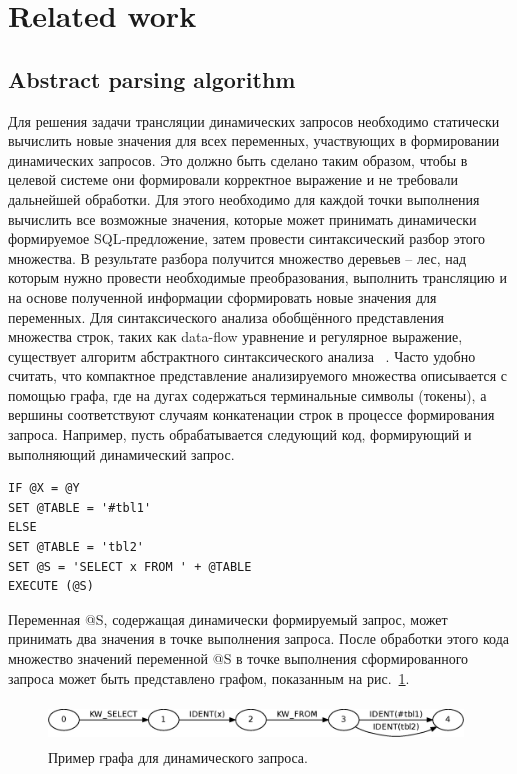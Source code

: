 \documentclass{llncs}
\begin{document}
\section{Related work}

\subsection{Abstract parsing algorithm}

Для решения задачи трансляции динамических запросов необходимо статически вычислить новые значения для всех переменных, участвующих в формировании динамических запросов. Это должно быть сделано  таким образом, чтобы в целевой системе они формировали корректное выражение и не требовали дальнейшей обработки. Для этого необходимо для каждой точки выполнения вычислить все возможные значения, которые может принимать динамически формируемое SQL-предложение, затем провести синтаксический разбор этого множества. В результате разбора получится множество деревьев -- лес, над которым нужно провести необходимые преобразования, выполнить трансляцию и на основе полученной информации сформировать новые значения для переменных.
	Для синтаксического анализа обобщённого представления множества строк, таких как data-flow уравнение и регулярное выражение, существует алгоритм абстрактного синтаксического анализа ~\cite{AbstrParsing}. Часто удобно считать, что компактное представление анализируемого множества описывается с помощью графа, где на дугах содержаться терминальные символы (токены), а вершины соответствуют случаям конкатенации строк в процессе формирования запроса. Например, пусть обрабатывается следующий код, формирующий и выполняющий динамический запрос.
\begin{verbatim}
IF @X = @Y
SET @TABLE = '#tbl1'
ELSE
SET @TABLE = 'tbl2'
SET @S = 'SELECT x FROM ' + @TABLE
EXECUTE (@S)
\end{verbatim}
Переменная @S, содержащая динамически формируемый запрос, может принимать два значения в точке выполнения запроса. После обработки этого кода  множество значений переменной @S в точке выполнения сформированного запроса может быть представлено графом, показанным на рис.~\ref{pic1}.

\begin{figure}
    \begin{center}
        \includegraphics[width=11cm,height=1.1cm]{graphs/simple_sql.eps}
        \caption{Пример графа для динамического запроса.}
        \label{pic1}        
    \end{center}
\end{figure}
\end{document}
